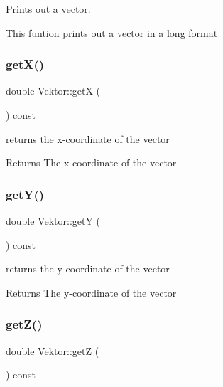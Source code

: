Prints out a vector. 

This funtion prints out a vector in a long format \mbox{\label{class_vektor_ad1864a78b96956dc7f504bba9b39af45}} 
\subsubsection{\texorpdfstring{get\+X()}{getX()}}
{\footnotesize\ttfamily double Vektor\+::getX (\begin{DoxyParamCaption}{ }\end{DoxyParamCaption}) const}



returns the x-\/coordinate of the vector 

\begin{DoxyReturn}{Returns}
The x-\/coordinate of the vector 
\end{DoxyReturn}
\mbox{\label{class_vektor_a93d6584667064c7e3abc9d42b529db93}} 
\subsubsection{\texorpdfstring{get\+Y()}{getY()}}
{\footnotesize\ttfamily double Vektor\+::getY (\begin{DoxyParamCaption}{ }\end{DoxyParamCaption}) const}



returns the y-\/coordinate of the vector 

\begin{DoxyReturn}{Returns}
The y-\/coordinate of the vector 
\end{DoxyReturn}
\mbox{\label{class_vektor_aaef4681c5b2ce1348685eb4cd89bd9b2}} 
\subsubsection{\texorpdfstring{get\+Z()}{getZ()}}
{\footnotesize\ttfamily double Vektor\+::getZ (\begin{DoxyParamCaption}{ }\end{DoxyParamCaption}) const}



